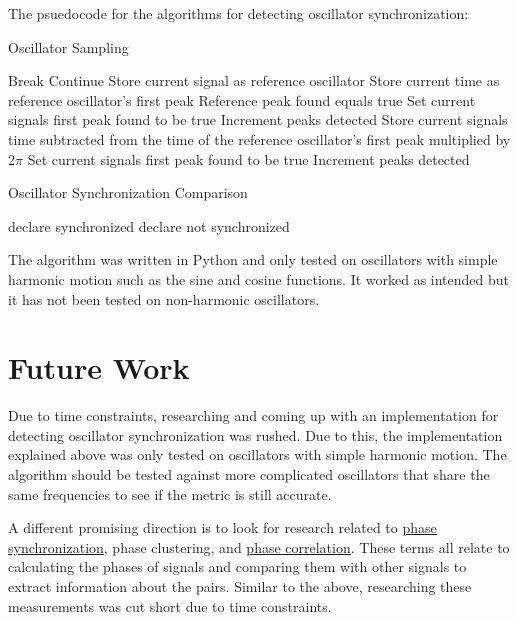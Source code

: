\documentclass{article}
\begin{document}
The psuedocode for the algorithms for detecting oscillator synchronization:
\begin{algorithm}[H]
	\caption{Oscillator Sampling}
	\begin{algorithmic}[1]
		\State Break
		\EndIf
		\State Continue
		\EndIf
		\State Store current signal as reference oscillator
		\State Store current time as reference oscillator's first peak
		\State Reference peak found equals true
		\State Set current signals first peak found to be true
		\State Increment peaks detected
		\Else
		\State Store current signals time subtracted from the time of the reference oscillator's first peak 
		\State multiplied by 2$\pi$
		\State Set current signals first peak found to be true
		\State Increment peaks detected
		\EndIf
		\EndIf
		\EndFor
		\EndFor
	\end{algorithmic} 
\end{algorithm} 

\begin{algorithm}[H]
	\caption{Oscillator Synchronization Comparison}
	\begin{algorithmic}[1]
		\State declare synchronized
		\Else
		\State declare not synchronized
		\EndIf 
		\EndFor
		\EndFor
	\end{algorithmic} 
\end{algorithm} 

The algorithm was written in Python and only tested on oscillators with simple harmonic motion such as the sine and cosine functions. It worked as intended but it has not been tested on non-harmonic oscillators.

\section{Future Work}
Due to time constraints, researching and coming up with an implementation for detecting oscillator synchronization was rushed. Due to this, the implementation explained above was only tested on oscillators with simple harmonic motion. The algorithm should be tested against more complicated oscillators that share the same frequencies to see if the metric is still accurate.

A different promising direction is to look for research related to \href{https://en.wikipedia.org/wiki/Phase_synchronization}{phase synchronization}, phase clustering, and \href{https://en.wikipedia.org/wiki/Phase_correlation}{phase correlation}. These terms all relate to calculating the phases of signals and comparing them with other signals to extract information about the pairs. Similar to the above, researching these measurements was cut short due to time constraints.



\end{document}
